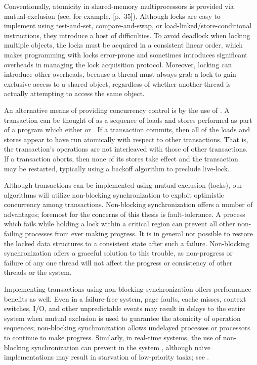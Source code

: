 Conventionally, atomicity in shared-memory multiprocessors is provided
via mutual-exclusion  (see, for example,
\cite{Tanenbaum92}[p.~35]).  Although locks are easy to
implement using test-and-set, compare-and-swap, or
load-linked/{\bp}store-conditional instructions, they introduce a host of
difficulties.  To avoid deadlock when locking multiple objects, the
locks must be acquired in a consistent linear order, which makes
programming with locks error-prone and sometimes introduces
significant overheads in managing the lock acquisition protocol.
Moreover, locking can introduce other overheads, because a thread must
always grab a lock to gain exclusive access to a shared object,
regardless of whether another thread is actually attempting to access
the same object.

An alternative means of providing concurrency control is by the use of
.
A transaction can be thought of as a sequence of loads and stores
performed as part of a program which either
 or .  If a transaction
commits, then all of the loads and stores appear to have run
atomically with respect to other transactions.  That is, the
transaction's operations are not interleaved with those of other
transactions.  If a transaction aborts, then none of its stores take
effect and the transaction may be restarted, typically using a
backoff algorithm to preclude live-lock.

Although transactions can be implemented using mutual exclusion
(locks), our algorithms will utilize non-blocking synchronization
\cite{Lamport77,Herlihy88,HerlihyLuMo03,MassalinPu91,GreenwaldCh96} to
exploit optimistic concurrency among transactions.  Non-blocking
synchronization offers a number of advantages; foremost for the
concerns of this thesis is fault-tolerance.  A process which fails
while holding a lock within a critical region can prevent all other
non-failing processes from ever making progress.  It is in general not
possible to restore the locked data structures to a consistent state
after such a failure.  Non-blocking synchronization offers a graceful
solution to this trouble, as non-progress or failure of any one thread
will not affect the progress or consistency of other threads or the
system.

Implementing transactions using
non-blocking synchronization offers performance benefits as well.
Even in a failure-free system, page faults, cache misses, context
switches, I/O, and other unpredictable events may result in delays to the
entire system when mutual exclusion is used to guarantee the atomicity
of operation sequences; non-blocking
synchronization allows undelayed processes or processors to continue
to make progress.
Similarly, in real-time systems, the use of non-blocking
synchronization can prevent  in the system
\cite{Jones97}, although na\"{\i}ve implementations may result in
starvation of low-priority tasks; see .

